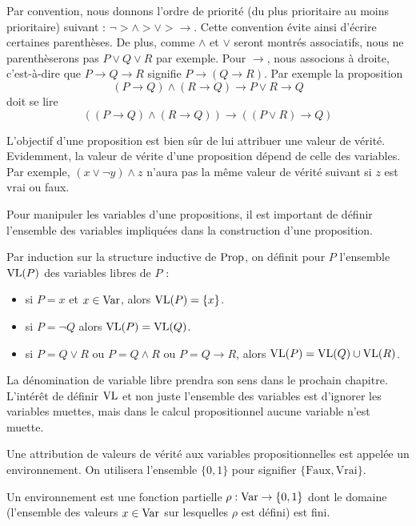Par convention, nous donnons l'ordre de priorité (du plus prioritaire au moins
prioritaire) suivant : $\lnot > \land > \lor > \to$. Cette convention évite ainsi
d'écrire certaines parenthèses. De plus, comme $\land$ et $\lor$ seront montrés
associatifs, nous ne parenthèserons pas $P\lor Q\lor R$ par exemple. Pour $\to$,
nous associons à droite, c'est-à-dire que $P\to Q\to R$ signifie
$P\to (Q \to R)$. Par exemple la proposition
\[(P \to Q)\land (R \to Q) \to P\lor R \to Q\] doit se lire
\[((P \to Q) \land (R \to Q)) \to ((P \lor R) \to Q)\]

L'objectif d'une proposition est bien sûr de lui attribuer une valeur de vérité.
Evidemment, la valeur de vérite d'une proposition dépend de celle des variables.
Par exemple, $(x\lor \lnot y) \land z$ n'aura pas la même valeur de vérité
suivant si $z$ est vrai ou faux.

Pour manipuler les variables d'une propositions, il est important de définir
l'ensemble des variables impliquées dans la construction d'une proposition.

\begin{definition}
  Par induction sur la structure inductive de $\operatorname{Prop}$, on définit pour
  $P$ l'ensemble $\operatorname{VL}(P)$ des variables libres de $P$ :
  \begin{itemize}
  \item si $P = x$ et $x\in\operatorname{Var}$, alors $\operatorname{VL}(P) = \{x\}$.
  \item si $P = \lnot Q$ alors $\operatorname{VL}(P) = \operatorname{VL}(Q)$.
  \item si $P = Q \lor R$ ou $P = Q \land R$ ou $P = Q \to R$,
    alors $\operatorname{VL}(P) = \operatorname{VL}(Q)\cup\operatorname{VL}(R)$.
  \end{itemize}
\end{definition}

\begin{remark}
  La dénomination de variable \og libre\fg{} prendra son sens dans le prochain
  chapitre. L'intérêt de définir $\operatorname{VL}$ et non juste l'ensemble des variables est
  d'ignorer les variables muettes, mais dans le calcul propositionnel aucune
  variable n'est muette.
\end{remark}

Une attribution de valeurs de vérité aux variables propositionnelles est appelée
un environnement. On utilisera l'ensemble $\{0,1\}$ pour signifier
$\{\mathrm{Faux},\mathrm{Vrai}\}$.

\begin{definition}[Environnement]
  Un environnement est une fonction partielle $\rho : \operatorname{Var} \to \{0,1\}$
  dont le domaine (l'ensemble des valeurs $x\in \operatorname{Var}$ sur lesquelles
  $\rho$ est défini) est fini.
\end{definition}

